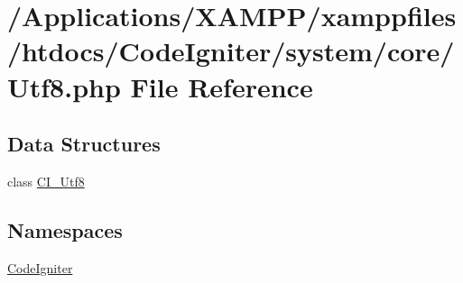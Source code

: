 \hypertarget{_utf8_8php}{}\section{/\+Applications/\+X\+A\+M\+P\+P/xamppfiles/htdocs/\+Code\+Igniter/system/core/\+Utf8.php File Reference}
\label{_utf8_8php}
\subsection*{Data Structures}
\begin{DoxyCompactItemize}
\item 
class \mbox{\hyperlink{class_c_i___utf8}{C\+I\+\_\+\+Utf8}}
\end{DoxyCompactItemize}
\subsection*{Namespaces}
\begin{DoxyCompactItemize}
\item 
 \mbox{\hyperlink{namespace_code_igniter}{Code\+Igniter}}
\end{DoxyCompactItemize}
